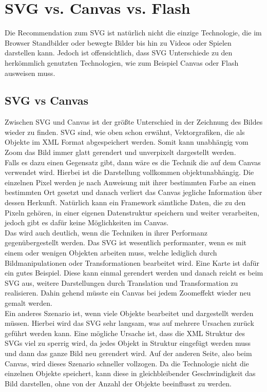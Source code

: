 \section{SVG vs. Canvas vs. Flash}
Die Recommendation zum SVG ist natürlich nicht die einzige Technologie, die im Browser Standbilder oder bewegte Bilder bis hin zu Videos oder Spielen darstellen kann. Jedoch ist offensichtlich, dass SVG Unterschiede zu den herkömmlich genutzten Technologien, wie zum Beispiel Canvas oder Flash ausweisen muss.
\subsection{SVG vs Canvas}
Zwischen SVG und Canvas ist der größte Unterschied in der Zeichnung des Bildes wieder zu finden. SVG sind, wie oben schon erwähnt, Vektorgrafiken, die als Objekte im XML Format abgespeichert werden. Somit kann unabhängig vom Zoom das Bild immer glatt gerendert und unverpixelt dargestellt werden.\\
Falls es dazu einen Gegensatz gibt, dann wäre es die Technik die auf dem Canvas verwendet wird. Hierbei ist die Darstellung vollkommen objektunabhängig. Die einzelnen Pixel werden je nach Anweisung mit ihrer bestimmten Farbe an einen bestimmten Ort gesetzt und danach verliert das Canvas jegliche Information über dessen Herkunft. Natürlich kann ein Framework sämtliche Daten, die zu den Pixeln gehören, in einer eigenen Datenstruktur speichern und weiter verarbeiten, jedoch gibt es dafür keine Möglichkeiten im Canvas.\\
Das wird auch deutlich, wenn die Techniken in ihrer Performanz gegenübergestellt werden. Das SVG ist wesentlich performanter, wenn es mit einem oder wenigen Objekten arbeiten muss, welche lediglich durch Bildmanipulationen oder Transformationen bearbeitet wird. Eine Karte ist dafür ein gutes Beispiel. Diese kann einmal gerendert werden und danach reicht es beim SVG aus, weitere Darstellungen durch Translation und Transformation zu realisieren. Dahin gehend müsste ein Canvas bei jedem Zoomeffekt wieder neu gemalt werden.\\
Ein anderes Szenario ist, wenn viele Objekte bearbeitet und dargestellt werden müssen. Hierbei wird das SVG sehr langsam, was auf mehrere Ursachen zurück geführt werden kann. Eine mögliche Ursache ist, dass die XML Struktur des SVGs viel zu sperrig wird, da jedes Objekt in Struktur eingefügt werden muss und dann das ganze Bild neu gerendert wird. Auf der anderen Seite, also beim Canvas, wird dieses Szenario schneller vollzogen. Da die Technologie nicht die einzelnen Objekte speichert, kann diese in gleichbleibender Geschwindigkeit das Bild darstellen, ohne von der Anzahl der Objekte beeinflusst zu werden.
